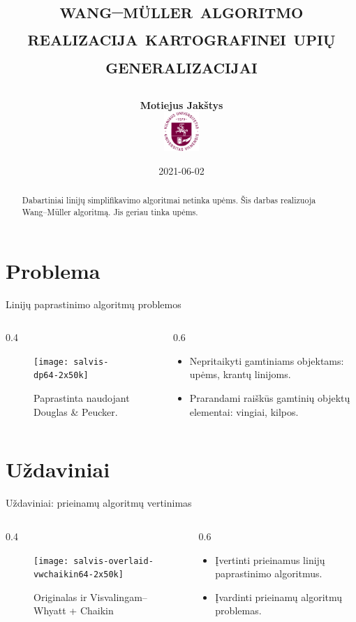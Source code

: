 \documentclass[14pt]{beamer}
\title{
    \Large\textsc{wang–müller algoritmo realizacija 
    kartografinei upių generalizacijai}

}
\author{\small \bf Motiejus Jakštys \\[4ex]
    \includegraphics[height=4em]{vu}
}
\date{\small 2021-06-02}
\newcommand{\DP}{Douglas \& Peucker}
\newcommand{\VW}{Visvalingam--Whyatt}
\newcommand{\WM}{Wang--M{\"u}ller}
\newcommand{\twocols}[2]
{
    \begin{columns}[c]
        \begin{column}{0.4\textwidth}
            #1
        \end{column}
        \begin{column}{0.6\textwidth}
            #2
        \end{column}
    \end{columns}
}
\begin{document}

\begin{frame}
\titlepage
\end{frame}

\begin{frame}
  \begin{abstract}

    Dabartiniai linijų simplifikavimo algoritmai netinka upėms. Šis darbas
    realizuoja {\WM} algoritmą. Jis geriau tinka upėms.

  \end{abstract}
\end{frame}

\section{Problema}

\begin{frame}{Linijų paprastinimo algoritmų problemos}
  \twocols{
    \begin{figure}[ht]
      \texttt{[image: salvis-dp64-2x50k]}
      \caption{\footnotesize Paprastinta naudojant {\DP}.}
    \end{figure}
  }{
    \begin{itemize}
      \item Nepritaikyti gamtiniams objektams: upėms, krantų linijoms.
      \item Prarandami raiškūs gamtinių objektų elementai: vingiai, kilpos.
    \end{itemize}
  }
\end{frame}

\section{Uždaviniai}

\begin{frame}{Uždaviniai: prieinamų algoritmų vertinimas}
  \twocols{
    \begin{figure}[ht]
      \texttt{[image: salvis-overlaid-vwchaikin64-2x50k]}
      \caption{\footnotesize Originalas ir {\VW} + Chaikin}
    \end{figure}
  }{
    \begin{itemize}
      \item Įvertinti prieinamus linijų paprastinimo algoritmus.
      \item Įvardinti prieinamų algoritmų problemas.
    \end{itemize}
  }
\end{frame}
\end{document}
